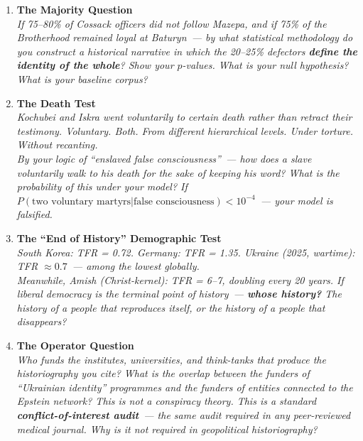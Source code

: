 \documentclass[11pt,a4paper]{article}
\theoremstyle{definition}
\theoremstyle{remark}
\begin{document}
\begin{questionbox}

\begin{enumerate}[leftmargin=1.5cm, itemsep=10pt]

  \item \textbf{The Majority Question}\\
    \textit{If 75--80\% of Cossack officers did not follow Mazepa,
    and if 75\% of the Brotherhood remained loyal at Baturyn~---
    by what statistical methodology do you construct a historical
    narrative in which the 20--25\% defectors
    \textbf{define the identity of the whole}?
    Show your $p$-values.
    What is your null hypothesis?
    What is your baseline corpus?}

  \item \textbf{The Death Test}\\
    \textit{Kochubei and Iskra went voluntarily to certain death
    rather than retract their testimony.
    Voluntary. Both. From different hierarchical levels.
    Under torture. Without recanting.\\[0.2cm]
    By your logic of ``enslaved false consciousness''~---
    how does a slave voluntarily walk to his death
    for the sake of keeping his word?
    What is the probability of this under your model?
    If $P(\text{two voluntary martyrs}|\text{false consciousness}) < 10^{-4}$~---
    your model is falsified.}

  \item \textbf{The ``End of History'' Demographic Test}\\
    \textit{South Korea: TFR = 0.72.
    Germany: TFR = 1.35.
    Ukraine (2025, wartime): TFR $\approx 0.7$~--- among the lowest globally.\\
    Meanwhile, Amish (Christ-kernel): TFR = 6--7,
    doubling every 20 years.
    If liberal democracy is the terminal point of history~---
    \textbf{whose history?}
    The history of a people that reproduces itself,
    or the history of a people that disappears?}

  \item \textbf{The Operator Question}\\
    \textit{Who funds the institutes, universities, and think-tanks
    that produce the historiography you cite?
    What is the overlap between the funders of
    ``Ukrainian identity'' programmes and the funders of
    entities connected to the Epstein network?
    This is not a conspiracy theory.
    This is a standard \textbf{conflict-of-interest audit}~---
    the same audit required in any peer-reviewed medical journal.
    Why is it not required in geopolitical historiography?}


\end{enumerate}
\end{questionbox}
\end{document}

